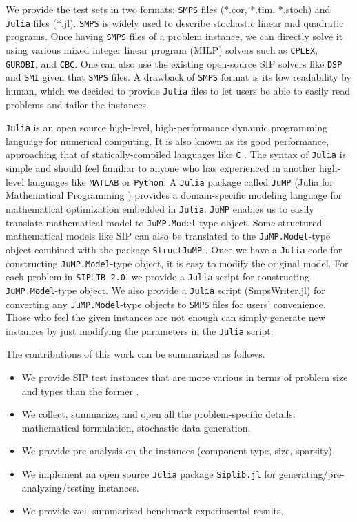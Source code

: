 We provide the test sets in two formats: \texttt{SMPS} files (*.cor, *.tim, *.stoch) and \texttt{Julia} files (*.jl). \texttt{SMPS} is widely used to describe stochastic linear and quadratic programs. Once having \texttt{SMPS} files of a problem instance, we can directly solve it using various mixed integer linear program (MILP) solvers such as \texttt{CPLEX}, \texttt{GUROBI}, and \texttt{CBC}. One can also use the existing open-source SIP solvers like \texttt{DSP} \cite{journal:KZ2015} and \texttt{SMI} \cite{web:SMI} given that \texttt{SMPS} files. A drawback of \texttt{SMPS} format is its low readability by human, which we decided to provide \texttt{Julia} files to let users be able to easily read problems and tailor the instances.

\texttt{Julia} is an open source high-level, high-performance dynamic programming language for numerical computing. It is also known as its good performance, approaching that of statically-compiled languages like \texttt{C} \cite{journal:BEKS2017}. The syntax of \texttt{Julia} is simple and should feel familiar to anyone who has experienced in another high-level languages like \texttt{MATLAB} or \texttt{Python}. A \texttt{Julia} package called \texttt{JuMP} (Julia for Mathematical Programming \cite{web:JuMP}) provides a domain-specific modeling language for mathematical optimization embedded in \texttt{Julia}. \texttt{JuMP} enables us to easily translate mathematical model to \texttt{JuMP.Model}-type object. Some structured mathematical models like SIP can also be translated to the \texttt{JuMP.Model}-type object combined with the package \texttt{StructJuMP} \cite{web:StructJuMP}. Once we have a \texttt{Julia} code for constructing \texttt{JuMP.Model}-type object, it is easy to modify the original model. For each problem in \texttt{SIPLIB 2.0}, we provide a \texttt{Julia} script for constructing \texttt{JuMP.Model}-type object. We also provide a \texttt{Julia} script (SmpsWriter.jl) for converting any \texttt{JuMP.Model}-type objects to \texttt{SMPS} files for users' convenience. Those who feel the given instances are not enough can simply generate new instances by just modifying the parameters in the \texttt{Julia} script.

The contributions of this work can be summarized as follows.
\begin{itemize}
	\item We provide SIP test instances that are more various in terms of problem size and types than the former \siplib.
	\item We collect, summarize, and open all the problem-specific details: mathematical formulation, stochastic data generation.
	\item We provide pre-analysis on the instances (component type, size, sparsity).
	\item We implement an open source \texttt{Julia} package \texttt{Siplib.jl} for generating/pre-analyzing/testing instances.
	\item We provide well-summarized benchmark experimental results.
\end{itemize}

